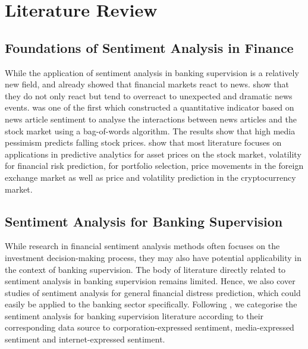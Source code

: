 \chapter{Literature Review}\label{sec3}
\thispagestyle{empty}



\section{Foundations of Sentiment Analysis in Finance}

While the application of sentiment analysis in banking supervision is a relatively new field, \cite{debondt1985} and \cite{cutler1988} already showed that financial markets react to news. \cite{debondt1985} show that they do not only react but tend to overreact to unexpected and dramatic news events. \cite{tetlock2007} was one of the first which constructed a quantitative indicator based on news article sentiment to analyse the interactions between news articles and the stock market using a bag-of-words algorithm. The results show that high media pessimism predicts falling stock prices. \cite{du2024} show that most literature focuses on applications in predictive analytics for asset prices on the stock market, volatility for financial risk prediction, for portfolio selection, price movements in the foreign exchange market as well as price and volatility prediction in the cryptocurrency market.

\section{Sentiment Analysis for Banking Supervision}

While research in financial sentiment analysis methods often focuses on the investment decision-making process, they may also have potential applicability in the context of banking supervision. The body of literature directly related to sentiment analysis in banking supervision remains limited. Hence, we also cover studies of sentiment analysis for general financial distress prediction, which could easily be applied to the banking sector specifically. Following \cite{kearney2014}, we categorise the sentiment analysis for banking supervision literature according to their corresponding data source to corporation-expressed sentiment, media-expressed sentiment and internet-expressed sentiment. \\

